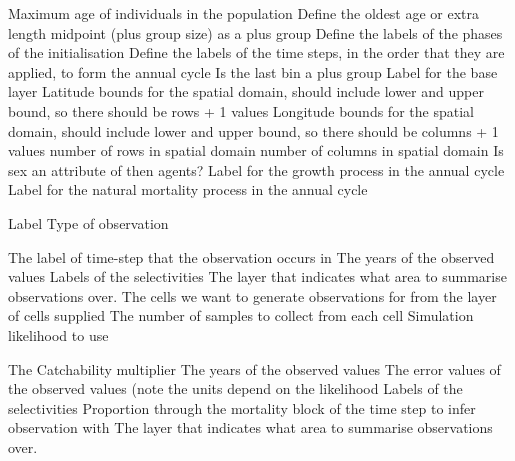  {Maximum age of individuals in the population}
 {Define the oldest age or extra length midpoint (plus group size) as a plus group}
 {Define the labels of the phases of the initialisation}
 {Define the labels of the time steps, in the order that they are applied, to form the annual cycle}
 {}
 {Is the last bin a plus group}
 {Label for the base layer}
 {Latitude bounds for the spatial domain, should include lower and upper bound, so there should be rows + 1 values}
 {Longitude bounds for the spatial domain, should include lower and upper bound, so there should be columns + 1 values}
 {number of rows in spatial domain}
 {number of columns in spatial domain}
 {Is sex an attribute of then agents?}
 {Label for the growth process in the annual cycle}
 {Label for the natural mortality process in the annual cycle}
\par\par
{} {Label}
 {Type of observation}
\par\textbf{}\par
{} {The label of time-step that the observation occurs in}
 {The years of the observed values}
 {Labels of the selectivities}
 {The layer that indicates what area to summarise observations over.}
 {The cells we want to generate observations for from the layer of cells supplied}
 {The number of samples to collect from each cell}
 {Simulation likelihood to use}
\par\textbf{}\par
{} {The Catchability multiplier}
 {The years of the observed values}
 {The error values of the observed values (note the units depend on the likelihood}
 {Labels of the selectivities}
 {Proportion through the mortality block of the time step to infer observation with}
 {The layer that indicates what area to summarise observations over.}

